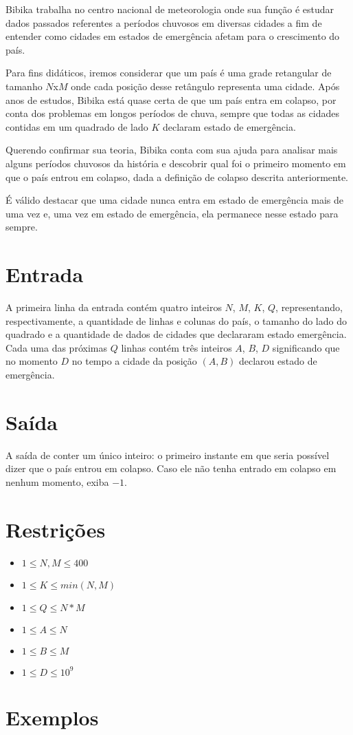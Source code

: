 Bibika trabalha no centro nacional de meteorologia onde sua função é estudar dados passados referentes a períodos chuvosos em diversas cidades a
fim de entender como cidades em estados de emergência afetam para o crescimento do país.

Para fins didáticos, iremos considerar que um país é uma grade retangular de tamanho $N$x$M$ onde cada posição desse retângulo representa uma cidade.
Após anos de estudos, Bibika está quase certa de que um país entra em colapso, por conta dos problemas em longos períodos de chuva, sempre que todas
as cidades contidas em um quadrado de lado $K$ declaram estado de emergência.

Querendo confirmar sua teoria, Bibika conta com sua ajuda para analisar mais alguns períodos chuvosos da história e descobrir qual foi o primeiro momento
em que o país entrou em colapso, dada a definição de colapso descrita anteriormente.

É válido destacar que uma cidade nunca entra em estado de emergência mais de uma vez e, uma vez em estado de emergência, ela permanece nesse estado para sempre.

\section*{Entrada}

A primeira linha da entrada contém quatro inteiros $N$, $M$, $K$, $Q$, representando, respectivamente, a quantidade de linhas e colunas do país,
o tamanho do lado do quadrado e a quantidade de dados de cidades que declararam estado emergência.
Cada uma das próximas $Q$ linhas contém três inteiros $A$, $B$, $D$ significando que no momento $D$ no tempo a cidade da posição $(A,B)$ declarou estado
de emergência. 

\section*{Saída}

A saída de conter um único inteiro: o primeiro instante em que seria possível dizer que o país entrou em colapso. 
Caso ele não tenha entrado em colapso em nenhum momento, exiba $-1$.

\section*{Restrições}

\begin{itemize}
\item $1 \leq N, M \leq 400$
\item $1 \leq K \leq min(N, M)$
\item $1 \leq Q \leq N*M$
\item $1 \leq A \leq N$
\item $1 \leq B \leq M$
\item $1 \leq D \leq 10^9$
\end{itemize}


\section*{Exemplos}

\exemplo
